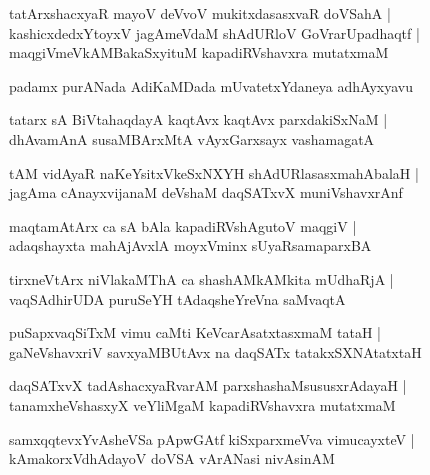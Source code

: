 \documentclass[twoside,12pt,openright]{book}
\newcounter{shloka}[chapter]
\begin{document}
\begin{shloka}
tatArxshacxyaR mayoV deVvoV mukitxdasasxvaR doVSahA |\\
kashicxdedxYtoyxV jagAmeVdaM shAdURloV GoVrarUpadhaqtf |\\
maqgiVmeVkAMBakaSxyituM kapadiRVshavxra mutatxmaM 
\end{shloka}

\begin{center}
padamx purANada AdiKaMDada mUvatetxYdaneya adhAyxyavu 
\end{center}

\begin{shloka}
tatarx sA BiVtahaqdayA kaqtAvx kaqtAvx parxdakiSxNaM |\\
dhAvamAnA susaMBArxMtA vAyxGarxsayx vashamagatA 
\end{shloka}

\begin{shloka}
tAM vidAyaR naKeYsitxVkeSxNXYH shAdURlasasxmahAbalaH |\\
jagAma cAnayxvijanaM deVshaM daqSATxvX muniVshavxrAnf 
\end{shloka}

\begin{shloka}
maqtamAtArx ca sA bAla kapadiRVshAgutoV maqgiV |\\
adaqshayxta mahAjAvxlA moyxVminx sUyaRsamaparxBA 
\end{shloka}

\begin{shloka}
tirxneVtArx niVlakaMThA ca shashAMkAMkita mUdhaRjA |\\
vaqSAdhirUDA puruSeYH tAdaqsheYreVna saMvaqtA 
\end{shloka}

\begin{shloka}
puSapxvaqSiTxM vimu caMti KeVcarAsatxtasxmaM tataH |\\
gaNeVshavxriV savxyaMBUtAvx na daqSATx tatakxSXNAtatxtaH 
\end{shloka}

\begin{shloka}
daqSATxvX tadAshacxyaRvarAM parxshashaMsususxrAdayaH |\\
tanamxheVshasxyX veYliMgaM kapadiRVshavxra mutatxmaM 
\end{shloka}

\begin{shloka}
samxqqtevxYvAsheVSa pApwGAtf kiSxparxmeVva vimucayxteV |\\
kAmakorxVdhAdayoV doVSA vArANasi nivAsinAM 
\end{shloka}
\end{document}
